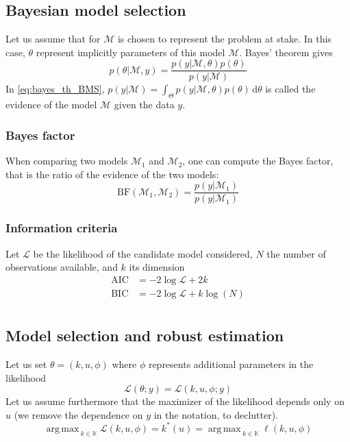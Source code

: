 \documentclass[a4paper,11pt]{article}
\newcommand{\Kspace}{\mathbb{K}}
\DeclareMathOperator*{\argmax}{arg\,max \,}
\theoremstyle{defi}
\numberwithin{thmCounter}{section}
\begin{document}
\subsection{Bayesian model selection}
\label{sec:bayes_model_selection}
Let us assume that for $\mathcal{M}$ is chosen to represent the problem at stake. In this case, $\theta$ represent implicitly parameters of this model $\mathcal{M}$. Bayes' theorem gives
\begin{equation}
  \label{eq:bayes_th_BMS}
  p(\theta | \mathcal{M}, y) = \frac{p(y | \mathcal{M}, \theta)p(\theta)}{p(y | \mathcal{M})}
\end{equation}
In \cref{eq:bayes_th_BMS}, $p(y | \mathcal{M}) = \int_{\Theta}p(y | \mathcal{M}, \theta)p(\theta) \,\mathrm{d}\theta$ is called the evidence of the model $\mathcal{M}$ given the data $y$.

\subsubsection{Bayes factor}
When comparing two models $\mathcal{M}_1$ and $\mathcal{M}_2$, one can compute the Bayes factor, that is the ratio of the evidence of the two models:
\begin{equation}
  \label{eq:bayes_factor}
  \mathrm{BF}(\mathcal{M}_1, \mathcal{M}_2) = \frac{p(y | \mathcal{M}_1)}{p(y | \mathcal{M}_1)}
\end{equation}

\subsubsection{Information criteria}
Let $\mathcal{L}$ be the likelihood of the candidate model considered, $N$ the number of observations available, and $k$ its dimension
\begin{align}
  \mathrm{AIC} &= -2\log \mathcal{L} + 2 k \\
  \mathrm{BIC} &= -2\log \mathcal{L} + k\log(N) \\
\end{align}
\subsection{Model selection and robust estimation}

Let us set $\theta = (k,u,\phi)$ where $\phi$ represents additional parameters in the likelihood
\begin{equation}
  \mathcal{L}(\theta; y) = \mathcal{L}(k, u, \phi ; y)
\end{equation}
Let us assume furthermore that the maximizer of the likelihood depends only on $u$ (we remove the dependence on $y$ in the notation, to declutter).
\begin{equation}
  \argmax_{k \in \Kspace} \mathcal{L}(k,u, \phi) = k^*(u) = \argmax_{k \in \Kspace} \ell(k,u, \phi)
\end{equation}
\end{document}
